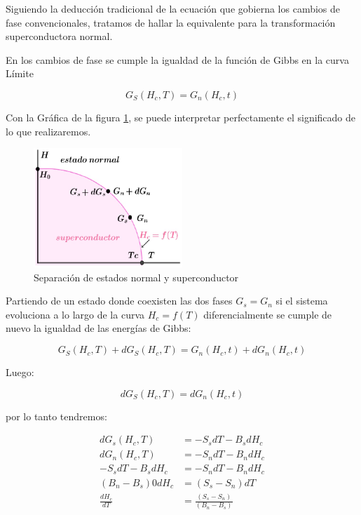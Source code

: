 Siguiendo la deducción tradicional de la ecuación que gobierna los cambios de fase convencionales, tratamos de hallar la equivalente para la transformación superconductora normal.

En los cambios de fase se cumple la igualdad de la función de Gibbs en la curva Límite 

\begin{equation}
	G_{S}(H_{c}, T)=G_{n}(H_{c},t)
\end{equation}

Con la Gráfica de la figura \ref{fig:425}, se puede interpretar perfectamente el significado de lo que realizaremos.

\begin{figure}[H]
    \centering
    \includegraphics[width=0.5\textwidth]{./Figures/fig425}
	\caption{Separación de estados normal y superconductor}
	\label{fig:425}
\end{figure}

Partiendo de un estado donde coexisten las dos fases $G_{s}=G_{n}$ si el sistema evoluciona a lo largo de la curva $H_{c}=f(T)$ diferencialmente se cumple de nuevo la igualdad de las energías de Gibbs:

\begin{equation*}
	G_{S}(H_{c}, T) + dG_{S}(H_{c}, T) = G_{n}(H_{c},t)+ dG_{n}(H_{c},t)
\end{equation*}

Luego:

\begin{equation}
	dG_{S}(H_{c}, T) = dG_{n}(H_{c},t)
\end{equation}

por lo tanto tendremos:

\begin{equation}
\begin{aligned}
	dG_{s}(H_{c}, T) & = -S_{s}dT-B_{s}dH_{c} \\
	dG_{n}(H_{c}, T) & = -S_{n}dT-B_{n}dH_{c} \\
	-S_{s}dT-B_{s}dH_{c}  & = -S_{n}dT-B_{n}dH_{c} \\
	(B_{n}-B_{s})0dH_{c} & = (S_{s}-S_{n})dT \\
	\frac{dH_{c}}{dT} & = \frac{(S_{s}-S_{n})}{(B_{n}-B_{s})}
\end{aligned}
\end{equation}

